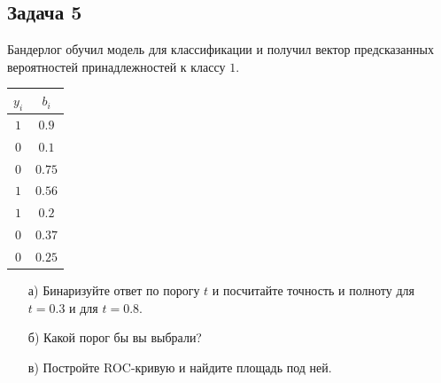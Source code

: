 \documentclass[12pt, a4paper, oneside]{article}
\begin{document}
\subsection*{Задача 5}

Бандерлог обучил модель для классификации и получил вектор предсказанных вероятностей принадлежностей к классу $1$. 

\begin{center}
	\begin{tabular}{c|c}
		$y_i$ & $b_i$ \\
		\hline
		$1$  & $0.9$ \\
		$0$ & $0.1$ \\
		$0$ & $0.75$ \\
		$1$ & $0.56$ \\
		$1$ & $0.2$ \\
		$0$ & $0.37$ \\
		$0$ & $0.25$ \\		
	\end{tabular}
\end{center}

\begin{enumerate}
	\item[а)]  Бинаризуйте ответ по порогу $t$ и посчитайте точность и полноту для $t = 0.3$ и для  $t = 0.8$.
	\item[б)]  Какой порог бы вы выбрали? 
	\item[в)]  Постройте ROC-кривую и найдите площадь под ней. 
\end{enumerate}
\end{document}

